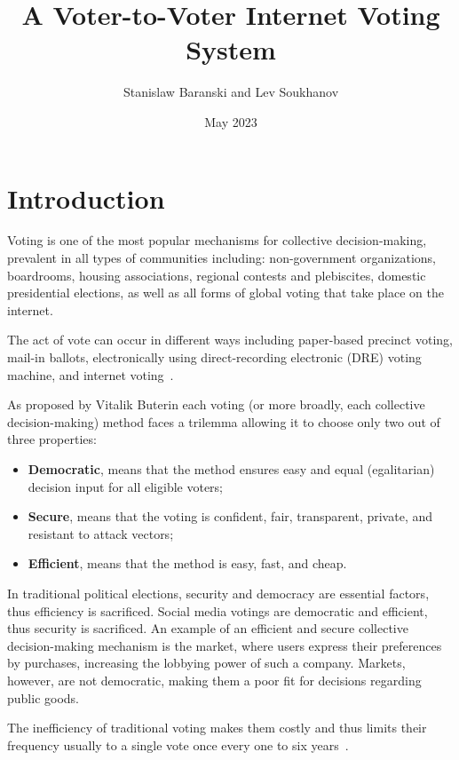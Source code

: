 \documentclass{article}
\title{A Voter-to-Voter Internet Voting System}
\author{Stanislaw Baranski and Lev Soukhanov}
\date{May 2023}
\begin{document}
\maketitle

\section{Introduction}

Voting is one of the most popular mechanisms for collective decision-making, prevalent in all types of communities including: non-government organizations, boardrooms, housing associations, regional contests and plebiscites, domestic presidential elections, as well as all forms of global voting that take place on the internet.

The act of vote can occur in different ways including paper-based precinct voting, mail-in ballots, electronically using direct-recording electronic (DRE) voting machine, and internet voting~\cite{parkGoingBadWorse2021}.

As proposed by Vitalik Buterin\cite{buterinBlockchainVotingOverrated2021} each voting (or more broadly, each collective decision-making) method faces a trilemma allowing it to choose only two out of three properties:

\begin{itemize}
    \item \textbf{Democratic}, means that the method ensures easy and equal (egalitarian) decision input for all eligible voters;
    \item \textbf{Secure}, means that the voting is confident, fair, transparent, private, and resistant to attack vectors;
    \item \textbf{Efficient}, means that the method is easy, fast, and cheap.
\end{itemize}

In traditional political elections, security and democracy are essential factors, thus efficiency is sacrificed. Social media votings are democratic and efficient, thus security is sacrificed. An example of an efficient and secure collective decision-making mechanism is the market, where users express their preferences by purchases, increasing the lobbying power of such a company. Markets, however, are not democratic, making them a poor fit for decisions regarding public goods. 

The inefficiency of traditional voting makes them costly and thus limits their frequency usually to a single vote once every one to six years~\cite{buterinBlockchainVotingOverrated2021}.
\end{document}
